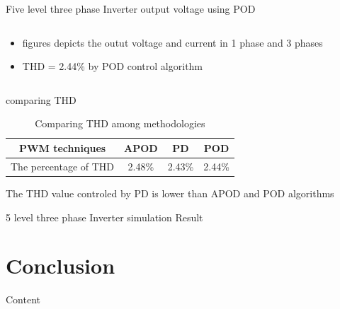 \documentclass[
	11pt, %
]{beamer}
\begin{document}
\begin{frame}{Five level three phase Inverter output voltage using POD}
\begin{columns}
\begin{column}{0.5\textwidth}
\begin{figure}
		\end{figure}
		\begin{itemize}
			\scriptsize
			\item {figures depicts the outut voltage and current in 1 phase and 3 phases}
			\item {THD = 2.44\% by POD control algorithm}
		\end{itemize}
	\end{column}
  \end{columns}
\end{frame}

\begin{frame}{comparing THD}
	\begin{table}[htbp]
		\centering
		\caption{Comparing THD among methodologies}
		\label{tab:example}
		\begin{tabular}{|c|c|c|c|}
			\hline
			PWM techniques & APOD & PD & POD \\
			\hline
			The percentage of THD & 2.48\% & 2.43\% & 2.44\% \\
			\hline
		\end{tabular}
	\end{table}
	\begin{center}
		\scriptsize{The THD value controled by PD is lower than APOD and POD algorithms}	
	\end{center}
\end{frame}

\begin{frame}{5 level three phase Inverter simulation Result}
	
\end{frame}


\section{Conclusion}
\begin{frame}{Content}
	
\end{frame}








\end{document}
